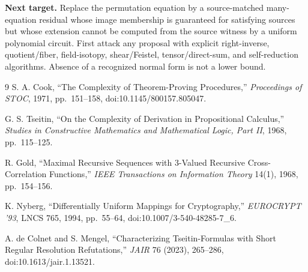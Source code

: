 \documentclass[11pt]{article}
\begin{document}
\textbf{Next target.}  Replace the permutation equation by a source-matched
many-equation residual whose image membership is guaranteed for satisfying
sources but whose extension cannot be computed from the source witness by a
uniform polynomial circuit.  First attack any proposal with explicit
right-inverse, quotient/fiber, field-isotopy, shear/Feistel, tensor/direct-sum,
and self-reduction algorithms.  Absence of a recognized normal form is not a
lower bound.

\begin{thebibliography}{9}
S. A. Cook, ``The Complexity of Theorem-Proving Procedures,''
\emph{Proceedings of STOC}, 1971, pp.~151--158,
doi:10.1145/800157.805047.

G. S. Tseitin, ``On the Complexity of Derivation in Propositional Calculus,''
\emph{Studies in Constructive Mathematics and Mathematical Logic, Part II},
1968, pp.~115--125.

R. Gold, ``Maximal Recursive Sequences with 3-Valued Recursive
Cross-Correlation Functions,'' \emph{IEEE Transactions on Information
Theory} 14(1), 1968, pp.~154--156.

K. Nyberg, ``Differentially Uniform Mappings for Cryptography,''
\emph{EUROCRYPT '93}, LNCS 765, 1994, pp.~55--64,
doi:10.1007/3-540-48285-7\_6.

A. de Colnet and S. Mengel, ``Characterizing Tseitin-Formulas with Short
Regular Resolution Refutations,'' \emph{JAIR} 76 (2023), 265--286,
doi:10.1613/jair.1.13521.
\end{thebibliography}
\end{document}

